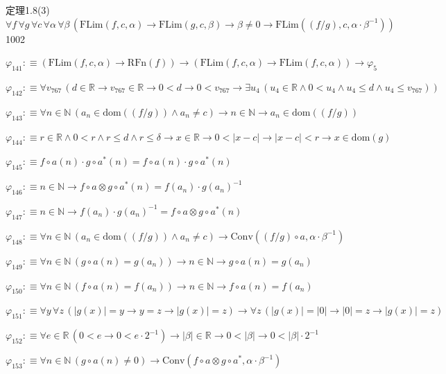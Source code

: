 \begin{fullproof}{定理1.8(3)}{$\forall f\,\forall g\,\forall c\,\forall \alpha\,\forall \beta\,(\mathrm{FLim}(f,c,\alpha) \to \mathrm{FLim}(g,c,\beta) \to \beta \neq 0 \to \mathrm{FLim}((f / g),c,\alpha \cdot \beta^{-1}))$}{1002}
\begin{abbrevlist}
\item $\varphi_{141} :\equiv (\mathrm{FLim}(f,c,\alpha) \to \mathrm{RFn}(f)) \to (\mathrm{FLim}(f,c,\alpha) \to \mathrm{FLim}(f,c,\alpha)) \to \varphi_{5}$
\item $\varphi_{142} :\equiv \forall v_{767}\,(d \in \mathbb{R} \to v_{767} \in \mathbb{R} \to 0 < d \to 0 < v_{767} \to \exists u_{4}\,(u_{4} \in \mathbb{R} \land 0 < u_{4} \land u_{4} \leq d \land u_{4} \leq v_{767}))$
\item $\varphi_{143} :\equiv \forall n \in \mathbb{N}\,(a_{n} \in \mathrm{dom}((f / g)) \land a_{n} \neq c) \to n \in \mathbb{N} \to a_{n} \in \mathrm{dom}((f / g))$
\item $\varphi_{144} :\equiv r \in \mathbb{R} \land 0 < r \land r \leq d \land r \leq \delta \to x \in \mathbb{R} \to 0 < \lvert x - c \rvert \to \lvert x - c \rvert < r \to x \in \mathrm{dom}(g)$
\item $\varphi_{145} :\equiv f \circ a(n) \cdot g \circ a^{\ast}(n) = f \circ a(n) \cdot g \circ a^{\ast}(n)$
\item $\varphi_{146} :\equiv n \in \mathbb{N} \to f \circ a \otimes g \circ a^{\ast}(n) = f(a_{n}) \cdot g(a_{n})^{-1}$
\item $\varphi_{147} :\equiv n \in \mathbb{N} \to f(a_{n}) \cdot g(a_{n})^{-1} = f \circ a \otimes g \circ a^{\ast}(n)$
\item $\varphi_{148} :\equiv \forall n \in \mathbb{N}\,(a_{n} \in \mathrm{dom}((f / g)) \land a_{n} \neq c) \to \mathrm{Conv}((f / g) \circ a,\alpha \cdot \beta^{-1})$
\item $\varphi_{149} :\equiv \forall n \in \mathbb{N}\,(g \circ a(n) = g(a_{n})) \to n \in \mathbb{N} \to g \circ a(n) = g(a_{n})$
\item $\varphi_{150} :\equiv \forall n \in \mathbb{N}\,(f \circ a(n) = f(a_{n})) \to n \in \mathbb{N} \to f \circ a(n) = f(a_{n})$
\item $\varphi_{151} :\equiv \forall y\,\forall z\,(\lvert g(x) \rvert = y \to y = z \to \lvert g(x) \rvert = z) \to \forall z\,(\lvert g(x) \rvert = \lvert 0 \rvert \to \lvert 0 \rvert = z \to \lvert g(x) \rvert = z)$
\item $\varphi_{152} :\equiv \forall e \in \mathbb{R}\,(0 < e \to 0 < e \cdot 2^{-1}) \to \lvert \beta \rvert \in \mathbb{R} \to 0 < \lvert \beta \rvert \to 0 < \lvert \beta \rvert \cdot 2^{-1}$
\item $\varphi_{153} :\equiv \forall n \in \mathbb{N}\,(g \circ a(n) \neq 0) \to \mathrm{Conv}(f \circ a \otimes g \circ a^{\ast},\alpha \cdot \beta^{-1})$

\end{abbrevlist}
\end{fullproof}

